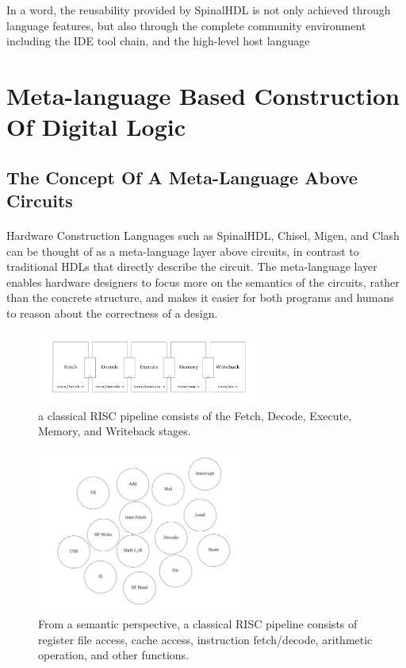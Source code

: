 \documentclass{article}
\begin{document}
In a word, the reusability provided by SpinalHDL is not only achieved through language features, but also through the complete community environment including the IDE tool chain, and the high-level host language



\section{Meta-language Based Construction Of Digital Logic}
\subsection{The Concept Of A Meta-Language Above Circuits}
\paragraph{}
Hardware Construction Languages such as SpinalHDL, Chisel, Migen, and Clash can be thought of as a meta-language layer above circuits, in contrast to traditional HDLs that directly describe the circuit. The meta-language layer enables hardware designers to focus more on the semantics of the circuits, rather than the concrete structure, and makes it easier for both programs and humans to reason about the correctness of a design.

\begin{figure}[hbt]
\centering
\includegraphics[width=0.65\textwidth]{Frame_1(1).png}
\caption{\label{fig:frame1} a classical RISC pipeline consists of the Fetch, Decode, Execute, Memory, and Writeback stages.}
\end{figure}

\begin{figure}
\centering
\includegraphics[width=0.6\textwidth]{Frame_1(2).png}
\caption{\label{fig:frame3}From a semantic perspective, a classical RISC pipeline consists of register file access, cache access, instruction fetch/decode, arithmetic operation, and other functions.}
\end{figure}
\end{document}
